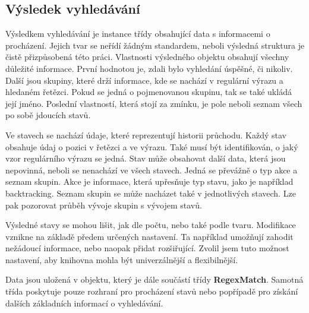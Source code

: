 \subsection*{Výsledek vyhledávání}

Výsledkem vyhledávání je instance třídy obsahující data s informacemi o procházení.
Jejich tvar se neřídí žádným standardem, neboli výsledná struktura je čistě přizpůsobená této práci.
Vlastnosti výsledného objektu obsahují všechny důležité informace.
První hodnotou je, zdali bylo vyhledání úspěšné, či nikoliv. 
Další jsou skupiny, které drží informace, kde se nachází v regulární výrazu a hledaném řetězci. 
Pokud se jedná o pojmenovanou skupinu, tak se také ukládá její jméno. 
Poslední vlastností, která stojí za zmínku, je pole neboli seznam všech po sobě jdoucích stavů.

Ve stavech se nachází údaje, které reprezentují historii průchodu.
Každý stav obsahuje údaj o pozici v řetězci a ve výrazu. 
Také musí být identifikován, o jaký vzor regulárního výrazu se jedná.
Stav může obsahovat další data, která jsou nepovinná, neboli se nenachází ve všech stavech.
Jedná se převážně o typ akce a seznam skupin.
Akce je informace, která upřesňuje typ stavu, jako je například backtracking.
Seznam skupin se může nacházet také v jednotlivých stavech.
Lze pak pozorovat průběh vývoje skupin s vývojem stavů.

Výsledné stavy se mohou lišit, jak dle počtu, nebo také podle tvaru. 
Modifikace vznikne na základě předem určených nastavení.
Ta například umožňují zahodit nežádoucí informace, nebo naopak přidat rozšiřující.
Zvolil jsem tuto možnost nastavení, aby knihovna mohla být univerzálnější a flexibilnější.

Data jsou uložená v objektu, který je dále součástí třídy \textbf{RegexMatch}.
Samotná třída poskytuje pouze rozhraní pro procházení stavů nebo popřípadě pro získání dalších základních informací o vyhledávání.

\endinput